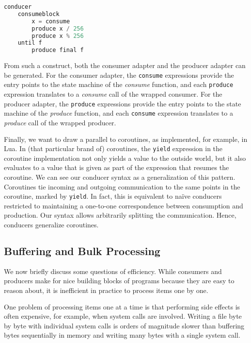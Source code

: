 \documentclass[sigplan,screen,10pt,anonymous,review]{acmart}
\begin{document}
\begin{lstlisting}[language=Python]
conducer
    consumeblock
        x = consume
        produce x / 256
        produce x % 256
    until f
        produce final f
\end{lstlisting}

From such a construct, both the consumer adapter and the producer adapter can be generated. For the consumer adapter, the \texttt{consume} expressions provide the entry points to the state machine of the \textit{consume} function, and each \texttt{produce} expression translates to a \textit{consume} call of the wrapped consumer. For the producer adapter, the \texttt{produce} expressions provide the entry points to the state machine of the \textit{produce} function, and each \texttt{consume} expression translates to a \textit{produce} call of the wrapped producer.


Finally, we want to draw a parallel to coroutines\cite{moura2009revisiting}, as implemented, for example, in Lua\cite{ierusalimschy2006programming}. In (that particular brand of) coroutines, the \texttt{yield} expression in the coroutine implementation not only yields a value to the outside world, but it also evaluates to a value that is given as part of the expression that resumes the coroutine. We can see our conducer syntax as a generalization of this pattern. Coroutines tie incoming and outgoing communication to the same points in the coroutine, marked by \texttt{yield}. In fact, this is equivalent to naïve conducers restricted to maintaining a one-to-one correspondence between consumption and production. Our syntax allows arbitrarily splitting the communication. Hence, conducers generalize coroutines.

\subsection{Buffering and Bulk Processing}\label{bulk}

We now briefly discuss some questions of efficiency. While consumers and producers make for nice building blocks of programs because they are easy to reason about, it is inefficient in practice to process items one by one.

One problem of processing items one at a time is that performing side effects is often expensive, for example, when system calls are involved. Writing a file byte by byte with individual system calls is orders of magnitude slower than buffering bytes sequentially in memory and writing many bytes with a single system call.
\end{document}
